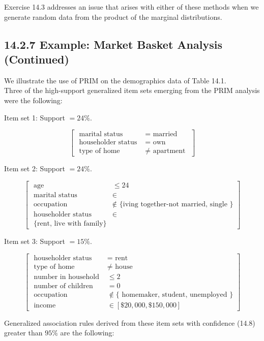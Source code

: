 \documentclass[10pt]{article}
\begin{document}
Exercise 14.3 addresses an issue that arises with either of these methods when we generate random data from the product of the marginal distributions.

\subsection*{14.2.7 Example: Market Basket Analysis (Continued)}
We illustrate the use of PRIM on the demographics data of Table 14.1.\\
Three of the high-support generalized item sets emerging from the PRIM analysis were the following:

Item set 1: Support $=24 \%$.

$$
\left[\begin{array}{rl}
\text { marital status } & =\text { married } \\
\text { householder status } & =\text { own } \\
\text { type of home } & \neq \text { apartment }
\end{array}\right]
$$

Item set 2: Support $=24 \%$.

$$
\left[\begin{array}{rl}
\text { age } & \leq 24 \\
\text { marital status } & \in \\
\text { occupation } & \notin \text { \{iving together-not married, single \}} \\
\text { householder status } & \in \\
\text { \{rent, live with family\} }
\end{array}\right]
$$

Item set 3: Support $=15 \%$.

$$
\left[\begin{array}{rl}
\text { householder status } & =\text { rent } \\
\text { type of home } & \neq \text { house } \\
\text { number in household } & \leq 2 \\
\text { number of children } & =0 \\
\text { occupation } & \notin\{\text { homemaker, student, unemployed }\} \\
\text { income } & \in[\$ 20,000, \$ 150,000]
\end{array}\right]
$$

Generalized association rules derived from these item sets with confidence (14.8) greater than $95 \%$ are the following:
\end{document}
